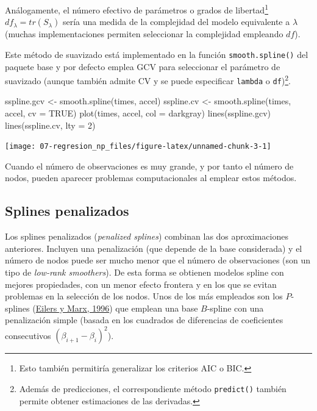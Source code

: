\documentclass[
]{book}
\newenvironment{Shaded}{\begin{snugshade}}{\end{snugshade}}
\newcommand{\AttributeTok}[1]{\textcolor[rgb]{0.77,0.63,0.00}{#1}}
\newcommand{\ConstantTok}[1]{\textcolor[rgb]{0.00,0.00,0.00}{#1}}
\newcommand{\DecValTok}[1]{\textcolor[rgb]{0.00,0.00,0.81}{#1}}
\newcommand{\FunctionTok}[1]{\textcolor[rgb]{0.00,0.00,0.00}{#1}}
\newcommand{\NormalTok}[1]{#1}
\newcommand{\OtherTok}[1]{\textcolor[rgb]{0.56,0.35,0.01}{#1}}
\newcommand{\StringTok}[1]{\textcolor[rgb]{0.31,0.60,0.02}{#1}}
\theoremstyle{break}
\theoremstyle{nonumberplain}
\begin{document}
Análogamente, el número efectivo de parámetros o grados de libertad\footnote{Esto también permitiría generalizar los criterios AIC o BIC.} \(df_{\lambda}=tr(S_{\lambda})\) sería una medida de la complejidad del modelo equivalente a \(\lambda\) (muchas implementaciones permiten seleccionar la complejidad empleando \(df\)).

Este método de suavizado está implementado en la función \texttt{smooth.spline()} del paquete base y por defecto emplea GCV para seleccionar el parámetro de suavizado (aunque también admite CV y se puede especificar \texttt{lambda} o \texttt{df})\footnote{Además de predicciones, el correspondiente método \texttt{predict()} también permite obtener estimaciones de las derivadas.}.

\begin{Shaded}
\begin{Highlighting}[]
\NormalTok{sspline.gcv }\OtherTok{\textless{}{-}} \FunctionTok{smooth.spline}\NormalTok{(times, accel)}
\NormalTok{sspline.cv }\OtherTok{\textless{}{-}} \FunctionTok{smooth.spline}\NormalTok{(times, accel, }\AttributeTok{cv =} \ConstantTok{TRUE}\NormalTok{)}
\FunctionTok{plot}\NormalTok{(times, accel, }\AttributeTok{col =} \StringTok{\textquotesingle{}darkgray\textquotesingle{}}\NormalTok{)}
\FunctionTok{lines}\NormalTok{(sspline.gcv)}
\FunctionTok{lines}\NormalTok{(sspline.cv, }\AttributeTok{lty =} \DecValTok{2}\NormalTok{)}
\end{Highlighting}
\end{Shaded}

\begin{center}\texttt{[image: 07-regresion\_np\_files/figure-latex/unnamed-chunk-3-1]} \end{center}

Cuando el número de observaciones es muy grande, y por tanto el número de nodos, pueden aparecer problemas computacionales al emplear estos métodos.

\hypertarget{splines-penalizados}{%
\subsection{Splines penalizados}\label{splines-penalizados}}

Los splines penalizados (\emph{penalized splines}) combinan las dos aproximaciones anteriores.
Incluyen una penalización (que depende de la base considerada) y el número de nodos puede ser mucho menor que el número de observaciones (son un tipo de \emph{low-rank smoothers}). De esta forma se obtienen modelos spline con mejores propiedades, con un menor efecto frontera y en los que se evitan problemas en la selección de los nodos.
Unos de los más empleados son los \(P\)-splines (\protect\hyperlink{ref-eilers1996flexible}{Eilers y Marx, 1996}) que emplean una base \(B\)-spline con una penalización simple (basada en los cuadrados de diferencias de coeficientes consecutivos \((\beta_{i+1} - \beta_i)^2\)).
\end{document}
